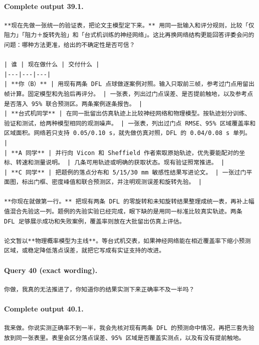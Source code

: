 \documentclass[UTF8,10pt]{ctexart}
\begin{document}
\paragraph{Complete output 39.1.}
\begin{Verbatim}[breaklines=true,breakanywhere=true,fontsize=\scriptsize,frame=single,framesep=2pt]
**现在先做一张统一的验证表，把论文主模型定下来。** 用同一批输入和评分规则，比较「仅阻力」「阻力＋旋转先验」和「台式机训练的神经网络」。这比再换网络结构更能回答评委会问的问题：哪种方法更准，给出的不确定性是否可信？

| 谁 | 现在做什么 | 交付什么 |
|---|---|---|
| **你（B）** | 用现有两条 DFL 点球做逐案例对照。输入只取前三帧，参考过门点用留出帧计算。固定模型和先验后再评分。 | 一张表，列出过门点误差、是否提前触地，以及参考点是否落入 95% 联合预测区。两条案例逐条报告。 |
| **台式机同学** | 在同一批留出仿真轨迹上比较神经网络和物理模型。按轨迹划分训练、验证和测试，给两种模型相同的观测噪声。 | 一张表，列出过门点 RMSE、95% 区域覆盖率和区域面积。网络若只支持 0.05/0.10 s，就先做仿真对照，DFL 的 0.04/0.08 s 单列。 |
| **A 同学** | 并行向 Vicon 和 Sheffield 作者索取原始轨迹，优先要能配对的坐标、转速和测量说明。 | 几条可用轨迹或明确的获取状态。现有验证照常推进。 |
| **C 同学** | 把题例的落点分布和 5/15/30 mm 敏感性结果写进论文。 | 一张过门平面图，标出门框、密度峰值和联合预测区，并注明观测误差和旋转先验。 |

**你现在就做第一行。** 把现有两条 DFL 的零旋转和未知旋转结果整理成统一表，再补上幅值混合先验这一列。题例的先验实验已经完成，眼下缺的是用同一标准比较真实轨迹。两条 DFL 足够展示成功和失败案例，覆盖率则放在大批留出仿真上评估。

论文暂以**物理概率模型为主线**。等台式机交表，如果神经网络能在相近覆盖率下缩小预测区域，或稳定降低落点误差，就把它写成有实证支持的改进。
\end{Verbatim}

\paragraph{Query 40 (exact wording).}
\begin{Verbatim}[breaklines=true,breakanywhere=true,fontsize=\scriptsize,frame=single,framesep=2pt]
你做，我真的无法推进了，你知道你的结果实测下来正确率不及一半吗？
\end{Verbatim}

\paragraph{Complete output 40.1.}
\begin{Verbatim}[breaklines=true,breakanywhere=true,fontsize=\scriptsize,frame=single,framesep=2pt]
我来做。你说实测正确率不到一半，我会先核对现有两条 DFL 的预测命中情况，再把三套先验放到同一张表里。表里会区分落点误差、95% 区域是否覆盖实测点，以及有没有提前触地。
\end{Verbatim}
\end{document}
